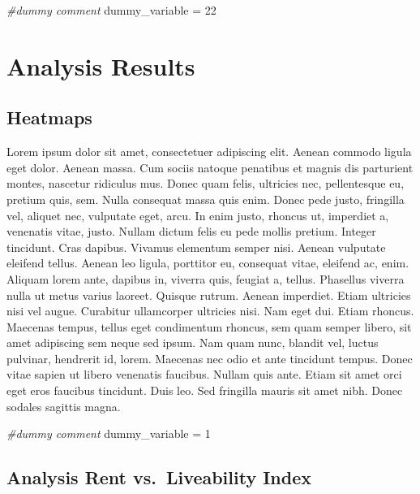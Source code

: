 \documentclass[]{book}
\newenvironment{Shaded}{\begin{snugshade}}{\end{snugshade}}
\newcommand{\DecValTok}[1]{\textcolor[rgb]{0.00,0.00,0.81}{#1}}
\newcommand{\StringTok}[1]{\textcolor[rgb]{0.31,0.60,0.02}{#1}}
\newcommand{\CommentTok}[1]{\textcolor[rgb]{0.56,0.35,0.01}{\textit{#1}}}
\newcommand{\NormalTok}[1]{#1}
\begin{document}
\begin{Shaded}
\begin{Highlighting}[]
\CommentTok{#dummy comment }
\NormalTok{dummy_variable =}\StringTok{ }\DecValTok{22}
\end{Highlighting}
\end{Shaded}

\chapter{Analysis Results}\label{analysis-results}

\section{Heatmaps}\label{heatmaps}

Lorem ipsum dolor sit amet, consectetuer adipiscing elit. Aenean commodo
ligula eget dolor. Aenean massa. Cum sociis natoque penatibus et magnis
dis parturient montes, nascetur ridiculus mus. Donec quam felis,
ultricies nec, pellentesque eu, pretium quis, sem. Nulla consequat massa
quis enim. Donec pede justo, fringilla vel, aliquet nec, vulputate eget,
arcu. In enim justo, rhoncus ut, imperdiet a, venenatis vitae, justo.
Nullam dictum felis eu pede mollis pretium. Integer tincidunt. Cras
dapibus. Vivamus elementum semper nisi. Aenean vulputate eleifend
tellus. Aenean leo ligula, porttitor eu, consequat vitae, eleifend ac,
enim. Aliquam lorem ante, dapibus in, viverra quis, feugiat a, tellus.
Phasellus viverra nulla ut metus varius laoreet. Quisque rutrum. Aenean
imperdiet. Etiam ultricies nisi vel augue. Curabitur ullamcorper
ultricies nisi. Nam eget dui. Etiam rhoncus. Maecenas tempus, tellus
eget condimentum rhoncus, sem quam semper libero, sit amet adipiscing
sem neque sed ipsum. Nam quam nunc, blandit vel, luctus pulvinar,
hendrerit id, lorem. Maecenas nec odio et ante tincidunt tempus. Donec
vitae sapien ut libero venenatis faucibus. Nullam quis ante. Etiam sit
amet orci eget eros faucibus tincidunt. Duis leo. Sed fringilla mauris
sit amet nibh. Donec sodales sagittis magna.

\begin{Shaded}
\begin{Highlighting}[]
\CommentTok{#dummy comment}
\NormalTok{dummy_variable =}\StringTok{ }\DecValTok{1}
\end{Highlighting}
\end{Shaded}

\section{Analysis Rent vs.~Liveability
Index}\label{analysis-rent-vs.liveability-index}
\end{document}
